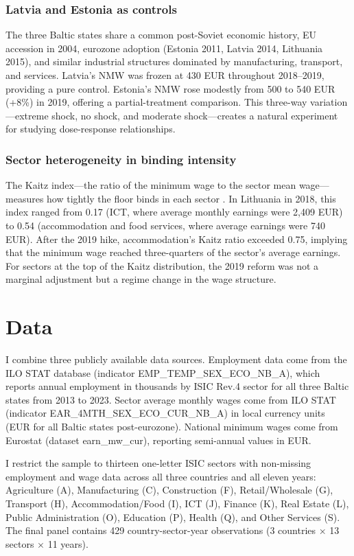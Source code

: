 \documentclass[12pt]{article}
\begin{document}
\subsubsection*{Latvia and Estonia as controls} The three Baltic states share a common post-Soviet economic history, EU accession in 2004, eurozone adoption (Estonia 2011, Latvia 2014, Lithuania 2015), and similar industrial structures dominated by manufacturing, transport, and services. Latvia's NMW was frozen at 430 EUR throughout 2018--2019, providing a pure control. Estonia's NMW rose modestly from 500 to 540 EUR (+8\%) in 2019, offering a partial-treatment comparison. This three-way variation---extreme shock, no shock, and moderate shock---creates a natural experiment for studying dose-response relationships.

\subsubsection*{Sector heterogeneity in binding intensity} The Kaitz index---the ratio of the minimum wage to the sector mean wage---measures how tightly the floor binds in each sector \citep{kaitz1970experience}. In Lithuania in 2018, this index ranged from 0.17 (ICT, where average monthly earnings were 2,409 EUR) to 0.54 (accommodation and food services, where average earnings were 740 EUR). After the 2019 hike, accommodation's Kaitz ratio exceeded 0.75, implying that the minimum wage reached three-quarters of the sector's average earnings. For sectors at the top of the Kaitz distribution, the 2019 reform was not a marginal adjustment but a regime change in the wage structure.

\section{Data}

I combine three publicly available data sources. Employment data come from the ILO STAT database (indicator EMP\_TEMP\_SEX\_ECO\_NB\_A), which reports annual employment in thousands by ISIC Rev.4 sector for all three Baltic states from 2013 to 2023. Sector average monthly wages come from ILO STAT (indicator EAR\_4MTH\_SEX\_ECO\_CUR\_NB\_A) in local currency units (EUR for all Baltic states post-eurozone). National minimum wages come from Eurostat (dataset earn\_mw\_cur), reporting semi-annual values in EUR.

I restrict the sample to thirteen one-letter ISIC sectors with non-missing employment and wage data across all three countries and all eleven years: Agriculture (A), Manufacturing (C), Construction (F), Retail/Wholesale (G), Transport (H), Accommodation/Food (I), ICT (J), Finance (K), Real Estate (L), Public Administration (O), Education (P), Health (Q), and Other Services (S). The final panel contains 429 country-sector-year observations (3 countries $\times$ 13 sectors $\times$ 11 years).
\end{document}
